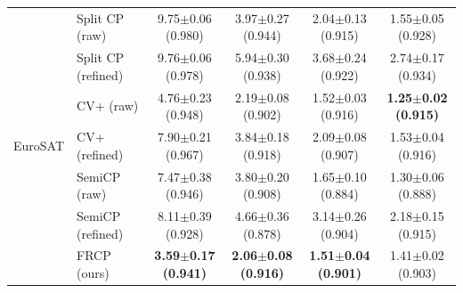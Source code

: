 \begin{table}[t]
\begin{tabular}{llcccc}
\multirow{7}{*}{EuroSAT} & Split CP (raw) & 9.75$\pm$0.06 {\scriptsize(0.980)} & 3.97$\pm$0.27 {\scriptsize(0.944)} & 2.04$\pm$0.13 {\scriptsize(0.915)} & 1.55$\pm$0.05 {\scriptsize(0.928)}\\
 & Split CP (refined) & 9.76$\pm$0.06 {\scriptsize(0.978)} & 5.94$\pm$0.30 {\scriptsize(0.938)} & 3.68$\pm$0.24 {\scriptsize(0.922)} & 2.74$\pm$0.17 {\scriptsize(0.934)}\\
 & CV+ (raw) & 4.76$\pm$0.23 {\scriptsize(0.948)} & 2.19$\pm$0.08 {\scriptsize(0.902)} & 1.52$\pm$0.03 {\scriptsize(0.916)} & \textbf{1.25$\pm$0.02 {\scriptsize(0.915)}}\\
 & CV+ (refined) & 7.90$\pm$0.21 {\scriptsize(0.967)} & 3.84$\pm$0.18 {\scriptsize(0.918)} & 2.09$\pm$0.08 {\scriptsize(0.907)} & 1.53$\pm$0.04 {\scriptsize(0.916)}\\
 & SemiCP (raw) & 7.47$\pm$0.38 {\scriptsize(0.946)} & 3.80$\pm$0.20 {\scriptsize(0.908)} & 1.65$\pm$0.10 {\scriptsize(0.884)} & 1.30$\pm$0.06 {\scriptsize(0.888)}\\
 & SemiCP (refined) & 8.11$\pm$0.39 {\scriptsize(0.928)} & 4.66$\pm$0.36 {\scriptsize(0.878)} & 3.14$\pm$0.26 {\scriptsize(0.904)} & 2.18$\pm$0.15 {\scriptsize(0.915)}\\
 & FRCP (ours) & \textbf{3.59$\pm$0.17 {\scriptsize(0.941)}} & \textbf{2.06$\pm$0.08 {\scriptsize(0.916)}} & \textbf{1.51$\pm$0.04 {\scriptsize(0.901)}} & 1.41$\pm$0.02 {\scriptsize(0.903)}\\
\bottomrule
\end{tabular}
\end{table}
